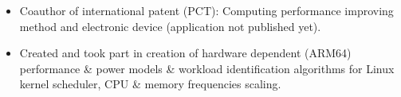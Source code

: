 
    \begin{itemize}
        \item Coauthor of international patent (PCT): Computing performance improving method and
            electronic device (application not published yet).
        \smallskip
        \item Created and took part in creation of hardware dependent (ARM64) performance \& power models \&
            workload identification algorithms for Linux kernel scheduler, CPU \& memory frequencies
            scaling.
    \end{itemize}

    \smallskip

